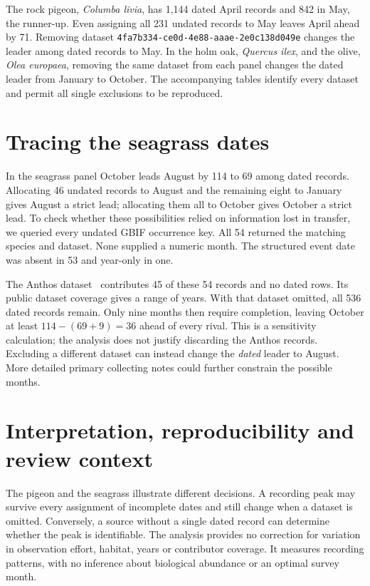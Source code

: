 \documentclass[11pt]{article}
\begin{document}
The rock pigeon, \emph{Columba livia}, has 1,144 dated April records and 842 in May, the runner-up. Even assigning all 231 undated records to May leaves April ahead by 71. Removing dataset \texttt{4fa7b334-ce0d-4e88-aaae-2e0c138d049e} changes the leader among dated records to May. In the holm oak, \emph{Quercus ilex}, and the olive, \emph{Olea europaea}, removing the same dataset from each panel changes the dated leader from January to October. The accompanying tables identify every dataset and permit all single exclusions to be reproduced.

\section{Tracing the seagrass dates}
In the seagrass panel October leads August by 114 to 69 among dated records. Allocating 46 undated records to August and the remaining eight to January gives August a strict lead; allocating them all to October gives October a strict lead. To check whether these possibilities relied on information lost in transfer, we queried every undated GBIF occurrence key. All 54 returned the matching species and dataset. None supplied a numeric month. The structured event date was absent in 53 and year-only in one.

The Anthos dataset~\cite{anthos} contributes 45 of these 54 records and no dated rows. Its public dataset coverage gives a range of years. With that dataset omitted, all 536 dated records remain. Only nine months then require completion, leaving October at least $114-(69+9)=36$ ahead of every rival. This is a sensitivity calculation; the analysis does not justify discarding the Anthos records. Excluding a different dataset can instead change the \emph{dated} leader to August. More detailed primary collecting notes could further constrain the possible months.

\section{Interpretation, reproducibility and review context}
The pigeon and the seagrass illustrate different decisions. A recording peak may survive every assignment of incomplete dates and still change when a dataset is omitted. Conversely, a source without a single dated record can determine whether the peak is identifiable. The analysis provides no correction for variation in observation effort, habitat, years or contributor coverage. It measures recording patterns, with no inference about biological abundance or an optimal survey month.
\end{document}
